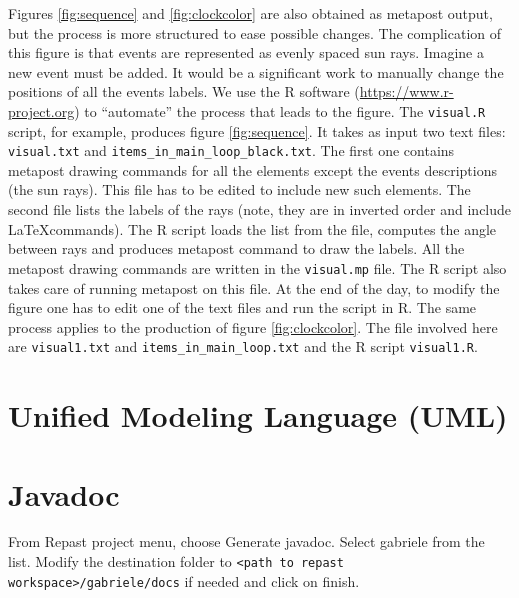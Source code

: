 \documentclass{book}
\begin{document}
Figures \ref{fig:sequence} and \ref{fig:clockcolor} are also obtained as metapost output, but the process is more structured to ease possible changes. The complication of this figure is that events are represented as evenly spaced sun rays. Imagine a new event must be added. It would be a significant work to manually change the positions of all the events labels. We use the R software (\href{https://www.r-project.org}{https://www.r-project.org}) to ``automate'' the process that leads to the figure. The \verb+visual.R+ script, for example, produces figure \ref{fig:sequence}. It takes as input two text files: \verb+visual.txt+ and \verb+items_in_main_loop_black.txt+. The first one contains metapost drawing commands for all the elements except the events descriptions (the sun rays). This file has to be edited to include new such elements. The second file lists the labels of the rays (note, they are in inverted order and include \LaTeX commands). The R script loads the list from the file, computes the angle between rays and produces metapost command to draw the labels. All the metapost drawing commands are written in the \verb+visual.mp+ file. The R script also takes care of running metapost on this file.
At the end of the day, to modify the figure one has to edit one of the text files and run the script in R. The same process applies to the production of figure \ref{fig:clockcolor}. The file involved here are \verb+visual1.txt+ and \verb+items_in_main_loop.txt+ and the R script \verb+visual1.R+.


\chapter{Unified Modeling Language (UML)}


\chapter{Javadoc}

From Repast project menu, choose Generate javadoc. Select gabriele from the list. Modify the destination folder to 
\verb+<path to repast workspace>/gabriele/docs+ if needed and click on finish.
\end{document}
